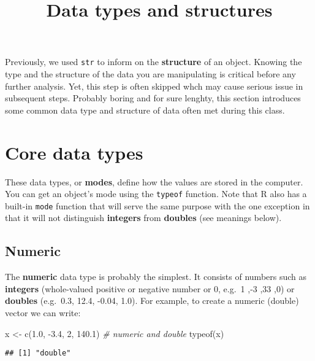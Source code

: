 \documentclass[
]{article}
\title{Data types and structures}
\author{}
\date{\vspace{-2.5em}}
\newenvironment{Shaded}{\begin{snugshade}}{\end{snugshade}}
\newcommand{\CommentTok}[1]{\textcolor[rgb]{0.56,0.35,0.01}{\textit{#1}}}
\newcommand{\DecValTok}[1]{\textcolor[rgb]{0.00,0.00,0.81}{#1}}
\newcommand{\FloatTok}[1]{\textcolor[rgb]{0.00,0.00,0.81}{#1}}
\newcommand{\FunctionTok}[1]{\textcolor[rgb]{0.00,0.00,0.00}{#1}}
\newcommand{\NormalTok}[1]{#1}
\newcommand{\OtherTok}[1]{\textcolor[rgb]{0.56,0.35,0.01}{#1}}
\newcommand{\SpecialCharTok}[1]{\textcolor[rgb]{0.00,0.00,0.00}{#1}}
\begin{document}
\maketitle

Previously, we used \texttt{str} to inform on the \textbf{structure} of
an object. Knowing the type and the structure of the data you are
manipulating is critical before any further analysis. Yet, this step is
often skipped whch may cause serious issue in subsequent steps. Probably
boring and for sure lenghty, this section introduces some common data
type and structure of data often met during this class.

\hypertarget{core-data-types}{%
\section{Core data types}\label{core-data-types}}

These data types, or \textbf{modes}, define how the values are stored in
the computer. You can get an object's mode using the \texttt{typeof}
function. Note that R also has a built-in \texttt{mode} function that
will serve the same purpose with the one exception in that it will not
distinguish \textbf{integers} from \textbf{doubles} (see meanings
below).

\hypertarget{numeric}{%
\subsection{Numeric}\label{numeric}}

The \textbf{numeric} data type is probably the simplest. It consists of
numbers such as \textbf{integers} (whole-valued positive or negative
number or 0, e.g.~1 ,-3 ,33 ,0) or \textbf{doubles} (e.g.~0.3, 12.4,
-0.04, 1.0). For example, to create a numeric (double) vector we can
write:

\begin{Shaded}
\begin{Highlighting}[]
\NormalTok{x }\OtherTok{\textless{}{-}} \FunctionTok{c}\NormalTok{(}\FloatTok{1.0}\NormalTok{, }\SpecialCharTok{{-}}\FloatTok{3.4}\NormalTok{, }\DecValTok{2}\NormalTok{, }\FloatTok{140.1}\NormalTok{) }\CommentTok{\# numeric and double}
\FunctionTok{typeof}\NormalTok{(x) }
\end{Highlighting}
\end{Shaded}

\begin{verbatim}
## [1] "double"
\end{verbatim}
\end{document}
